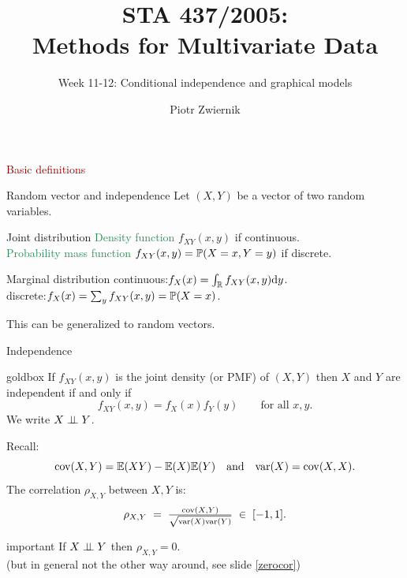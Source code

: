 \documentclass[11pt,handout,aspectratio=169,dvipsnames]{beamer}
\title[STA437-Week1]{STA 437/2005: \\ Methods for Multivariate Data}
\subtitle[]{Week 11-12: Conditional independence and graphical models}
\author[Piotr Zwiernik]{Piotr Zwiernik}
\institute[UofT]{University of Toronto}
\date{}
\begin{document}
\maketitle

\begin{frame}{}
\begin{center}
	{\huge \textcolor{DarkRed}{Basic definitions}}
\end{center}
\end{frame}

\begin{frame}{Random vector and independence}
	Let $(X,Y)$ be a vector of two random variables.
	\begin{alertblock}{Joint distribution}
		\textcolor{SeaGreen}{Density function} $f_{XY}(x,y)$ if continuous.\\[.1cm]
		\textcolor{SeaGreen}{Probability mass function} $f_{XY}(x,y)=\P(X=x,Y=y)$ if discrete.
	\end{alertblock}
		\begin{alertblock}{Marginal distribution}
continuous:\;\;\;$f_X(x)=\int_\R f_{XY}(x,y){\rm d}y$.\\[.1cm]
discrete:\;\;\;$f_X(x)=\sum_y f_{XY}(x,y)=\P(X=x)$.
	\end{alertblock}
	This can be generalized to random vectors.
\end{frame}

\begin{frame}{Independence}
\begin{beamercolorbox}[wd=\paperwidth,sep=2pt]{goldbox}
	If $f_{XY}(x,y)$ is the joint density (or PMF) of $(X,Y)$ then $X$ and $Y$ are independent if and only if \\[-.5cm] $$ f_{XY}(x,y)=f_X(x)f_Y(y)\qquad\mbox{for all }x,y.$$
		We write \alert{$X\indep Y$}.	
\end{beamercolorbox}
		Recall:
		$$
		\cov(X,Y)=\E(XY)-\E(X)\E(Y)\quad\mbox{and}\quad \var(X)=\cov(X,X).
		$$
		The correlation $\rho_{X,Y}$ between $X,Y$ is:
		$$
		\rho_{X,Y}\;=\;\tfrac{\cov(X,Y)}{\sqrt{\var(X)\var(Y)}}\;\in\;[-1,1].
		$$
		\begin{beamercolorbox}[wd=\paperwidth,sep=2pt]{important}
			If $X\indep Y$ then $\rho_{X,Y}=0$.\\ {\footnotesize(but in general not the other way around, see slide \ref{zerocor})}
		\end{beamercolorbox}
\end{frame}
\end{document}
